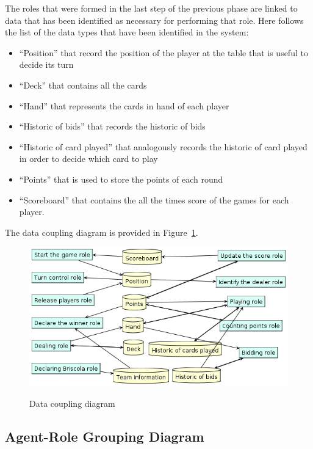 \documentclass[a4paper]{article}
\begin{document}
The roles that were formed in the last step of the previous phase are linked to data that has been identified as necessary for performing that role. Here follows the list of the data types that have been identified in the system: 
\begin{itemize}
  \item ``Position'' that record the position of the player at the table that is useful to decide its turn
  \item ``Deck'' that contains all the cards
  \item ``Hand'' that represents the cards in hand of each player
  \item ``Historic of bids'' that records the historic of bids
  \item ``Historic of card played'' that analogously records the historic of card played in order to decide which card to play
  \item ``Points'' that is used to store the points of each round
  \item ``Scoreboard'' that contains the all the times score of the games for each player. 
\end{itemize}

The data coupling diagram is provided in Figure~\ref{fig:datacoupl}.

\begin{figure}[htp]
  \centering
  \includegraphics[keepaspectratio,scale=0.45]{pdt/images/architectural_design/data_coupling.png}
  \label{fig:datacoupl}
  \caption{Data coupling diagram}
\end{figure}

\subsection{Agent-Role Grouping Diagram}
\end{document}
